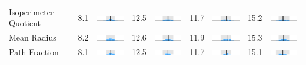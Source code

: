 \begin{table}
\begin{tabular}{l rm{7em} rm{7em} rm{7em} rm{7em}}
Isoperimeter Quotient  &   8.1 &       \includegraphics[width=7em]{mini_hist/TX_2004_polsby} &  12.5 &       \includegraphics[width=7em]{mini_hist/TX_2008_polsby} &  11.7 &       \includegraphics[width=7em]{mini_hist/TX_2012_polsby} &  15.2 &       \includegraphics[width=7em]{mini_hist/TX_2016_polsby} \\
Mean Radius            &   8.2 &  \includegraphics[width=7em]{mini_hist/TX_2004_mean_radius} &  12.6 &  \includegraphics[width=7em]{mini_hist/TX_2008_mean_radius} &  11.9 &  \includegraphics[width=7em]{mini_hist/TX_2012_mean_radius} &  15.3 &  \includegraphics[width=7em]{mini_hist/TX_2016_mean_radius} \\
Path Fraction          &   8.1 &    \includegraphics[width=7em]{mini_hist/TX_2004_path_frac} &  12.5 &    \includegraphics[width=7em]{mini_hist/TX_2008_path_frac} &  11.7 &    \includegraphics[width=7em]{mini_hist/TX_2012_path_frac} &  15.1 &    \includegraphics[width=7em]{mini_hist/TX_2016_path_frac} \\

\end{tabular}
\end{table}
